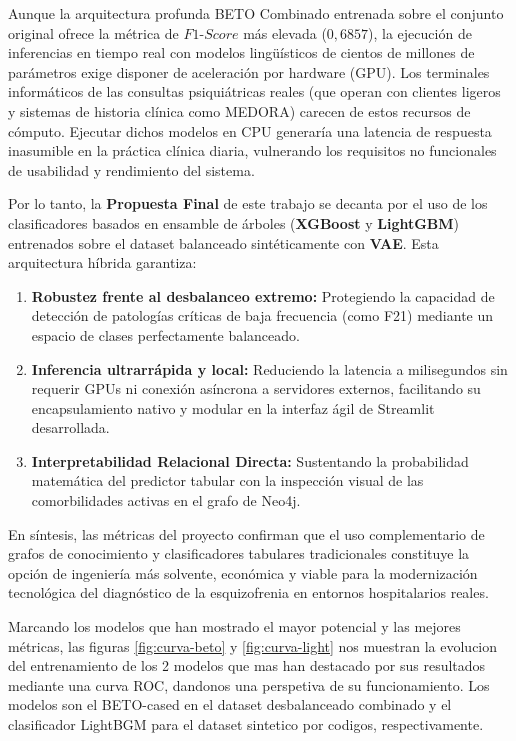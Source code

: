 \documentclass[12pt,a4paper,onecolumn,oneside]{report}
\begin{document}
Aunque la arquitectura profunda BETO Combinado entrenada sobre el conjunto original ofrece la métrica de $F1\text{-}Score$ más elevada ($0,6857$), la ejecución de inferencias en tiempo real con modelos lingüísticos de cientos de millones de parámetros exige disponer de aceleración por hardware (GPU). Los terminales informáticos de las consultas psiquiátricas reales (que operan con clientes ligeros y sistemas de historia clínica como MEDORA) carecen de estos recursos de cómputo. Ejecutar dichos modelos en CPU generaría una latencia de respuesta inasumible en la práctica clínica diaria, vulnerando los requisitos no funcionales de usabilidad y rendimiento del sistema.

Por lo tanto, la \textbf{Propuesta Final} de este trabajo se decanta por el uso de los clasificadores basados en ensamble de árboles (\textbf{XGBoost} y \textbf{LightGBM}) entrenados sobre el dataset balanceado sintéticamente con \textbf{VAE}. Esta arquitectura híbrida garantiza:
\begin{enumerate}
    \item \textbf{Robustez frente al desbalanceo extremo:} Protegiendo la capacidad de detección de patologías críticas de baja frecuencia (como F21) mediante un espacio de clases perfectamente balanceado.
    \item \textbf{Inferencia ultrarrápida y local:} Reduciendo la latencia a milisegundos sin requerir GPUs ni conexión asíncrona a servidores externos, facilitando su encapsulamiento nativo y modular en la interfaz ágil de Streamlit desarrollada.
    \item \textbf{Interpretabilidad Relacional Directa:} Sustentando la probabilidad matemática del predictor tabular con la inspección visual de las comorbilidades activas en el grafo de Neo4j.
\end{enumerate}

En síntesis, las métricas del proyecto confirman que el uso complementario de grafos de conocimiento y clasificadores tabulares tradicionales constituye la opción de ingeniería más solvente, económica y viable para la modernización tecnológica del diagnóstico de la esquizofrenia en entornos hospitalarios reales.

Marcando los modelos que han mostrado el mayor potencial y las mejores métricas, las figuras \ref{fig:curva-beto} y \ref{fig:curva-light} nos muestran la evolucion del entrenamiento de los 2 modelos que mas han destacado por sus resultados mediante una curva ROC, dandonos una perspetiva de su funcionamiento. Los modelos son el BETO-cased en el dataset desbalanceado combinado y el clasificador LightBGM para el dataset sintetico por codigos, respectivamente.
\end{document}
